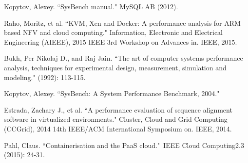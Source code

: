 \documentclass[11pt]{article}
\begin{document}
\begin{thebibliography}{99}
		Kopytov, Alexey. ``SysBench manual." MySQL AB (2012).
		
		Raho, Moritz, et al. ``KVM, Xen and Docker: A performance analysis for ARM based NFV and cloud computing." Information, Electronic and Electrical Engineering (AIEEE), 2015 IEEE 3rd Workshop on Advances in. IEEE, 2015.
		
		Bukh, Per Nikolaj D., and Raj Jain. ``The art of computer systems performance analysis, techniques for experimental design, measurement, simulation and modeling." (1992): 113-115.
		
		Kopytov, Alexey. ``SysBench: A System Performance Benchmark, 2004."
		
		Estrada, Zachary J., et al. ``A performance evaluation of sequence alignment software in virtualized environments." Cluster, Cloud and Grid Computing (CCGrid), 2014 14th IEEE/ACM International Symposium on. IEEE, 2014.
		
		Pahl, Claus. ``Containerisation and the PaaS cloud." IEEE Cloud Computing2.3 (2015): 24-31.
		
	\end{thebibliography}
	
\end{document}
